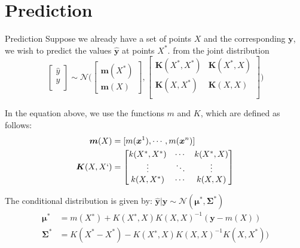 \documentclass{beamer}
\begin{document}
\section{Prediction}
\begin{frame}{Prediction}
Suppose we already have a set of points $X$ and the corresponding $\boldsymbol{y}$, we wish to predict the values $\hat{\boldsymbol{y}}$ at points $X^*$. from the joint distribution
\begin{equation*}
    \begin{bmatrix} 
    \hat{y}\\
    y\\
    \end{bmatrix}
    \sim \mathcal{N}\bigg(
    \begin{bmatrix}
    \boldsymbol{m}(X^*) \\
    \boldsymbol{m}(X)
    \end{bmatrix},
    \begin{bmatrix}
    \boldsymbol{K}(X^*, X^*)  & \boldsymbol{K}(X^*, X)\\
    \boldsymbol{K}(X, X^*)    & \boldsymbol{K}(X, X)\\
    \end{bmatrix}
    \bigg)
\end{equation*}

In the equation above, we use the functions $m$ and $K$, which are defined as follows:
\begin{equation*}
\begin{split}
\boldsymbol{m}(X) &= [m(\boldsymbol{x}^1), \cdots, m(\boldsymbol{x}^n)]\\
\boldsymbol{K}(X, X`) & = 
    \begin{bmatrix}
    k(X^*, X^*) & \cdots & k(X^*, X)\\
    \vdots & \ddots & \vdots \\
    k(X, X^*)  &\cdots  & k(X, X)
    \end{bmatrix}
\end{split}
\end{equation*}

The conditional distribution is given by: $\hat{\boldsymbol{y}} | \boldsymbol{y} \sim \mathcal{N}(\boldsymbol{\mu}^*, \boldsymbol{\Sigma}^*)$
\begin{equation*}
\begin{split}
    \boldsymbol{\mu}^* &= m(X^{∗}) +  K(X^{∗}, X) K(X, X)^{-1} (\boldsymbol{y} - m(X)) \\
    \boldsymbol{\Sigma}^* &= K(X^{*} - X^{*}) - K(X^{∗}, X)K(X, X)^{-1}K(X, X^{*}))    
\end{split}
\end{equation*}


\end{frame}
\end{document}
